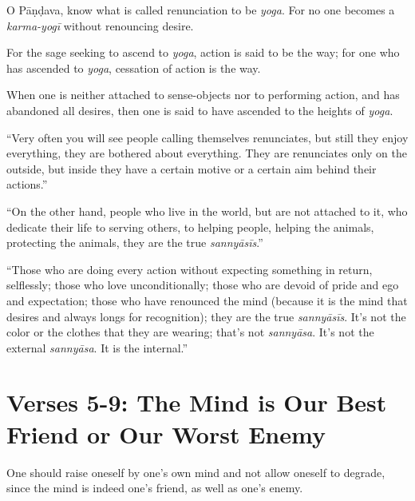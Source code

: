 {O Pāṇḍava, know what is called renunciation to be \textit{yoga}. For no one becomes a \textit{karma-yogī} without renouncing desire.}

{For the sage seeking to ascend to \textit{yoga}, action is said to be the way; for one who has ascended to \textit{yoga}, cessation of action is the way.}

{When one is neither attached to sense-objects nor to performing action, and has abandoned all desires, then one is said to have ascended to the heights of \textit{yoga}.}

\enquote{Very often you will see people calling themselves renunciates, but still they enjoy everything, they are bothered about everything. They are renunciates only on the outside, but inside they have a certain motive or a certain aim behind their actions.}

\enquote{On the other hand, people who live in the world, but are not attached to it, who dedicate their life to serving others, to helping people, helping the animals, protecting the animals, they are the true \textit{sannyāsīs}.}

\enquote{Those who are doing every action without expecting something in return, selflessly; those who love unconditionally; those who are devoid of pride and ego and expectation; those who have renounced the mind (because it is the mind that desires and always longs for recognition); they are the true \textit{sannyāsīs}. It's not the color or the clothes that they are wearing; that’s not \textit{sannyāsa}. It’s not the external \textit{sannyāsa}. It is the internal.}

\section{Verses 5-9: The Mind is Our Best Friend or Our Worst Enemy}\label{sec-verses-5-9-the-mind-is-our-best-friend-or-our-worst-enemy}

{One should raise oneself by one’s own mind and not allow oneself to degrade, since the mind is indeed one’s friend, as well as one’s enemy.}

